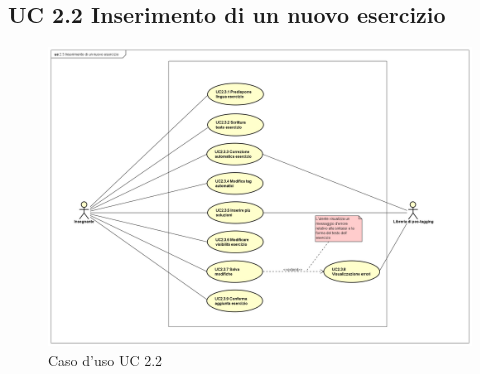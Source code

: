 




\subsection{UC 2.2 Inserimento di un nuovo esercizio}

\begin{figure}[H]
	\centering
	\includegraphics[width=18cm]{img/UC22.png} 
	\caption{Caso d'uso UC 2.2}
\end{figure}

